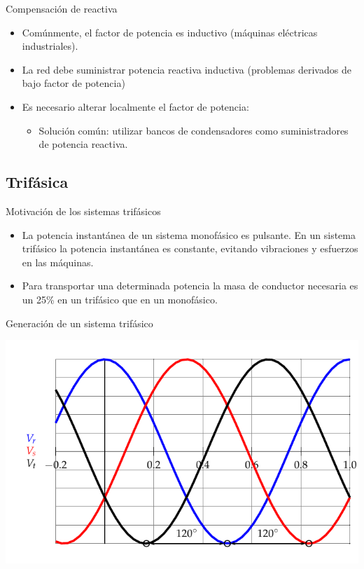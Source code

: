 \documentclass[xcolor={usenames,svgnames,dvipsnames}]{beamer}
\begin{document}
\begin{frame}[label={sec:org0c36b9d}]{Compensación de reactiva}
\begin{itemize}
\item Comúnmente, el factor de potencia es \alert{inductivo} (máquinas eléctricas
industriales).

\item La red debe suministrar potencia reactiva inductiva (problemas
derivados de bajo factor de potencia)

\item Es necesario alterar localmente el factor de potencia:

\begin{itemize}
\item Solución común: utilizar \alert{bancos de condensadores} como
suministradores de potencia reactiva.
\end{itemize}
\end{itemize}
\end{frame}

\subsection{Trifásica}
\label{sec:org3f5470d}

\begin{frame}[label={sec:orgcadea66}]{Motivación de los sistemas trifásicos}
\begin{itemize}
\item La potencia instantánea de un sistema monofásico es pulsante. En un
sistema trifásico la potencia instantánea es constante, evitando
vibraciones y esfuerzos en las máquinas.

\item Para transportar una determinada potencia la masa de conductor
necesaria es un 25\% en un trifásico que en un monofásico.
\end{itemize}
\end{frame}

\begin{frame}[label={sec:orgb63a968}]{Generación de un sistema trifásico}
\begin{center}
\includegraphics[width=.9\linewidth]{../figs/TensionesTrifasica.pdf}
\end{center}
\end{frame}
\end{document}
